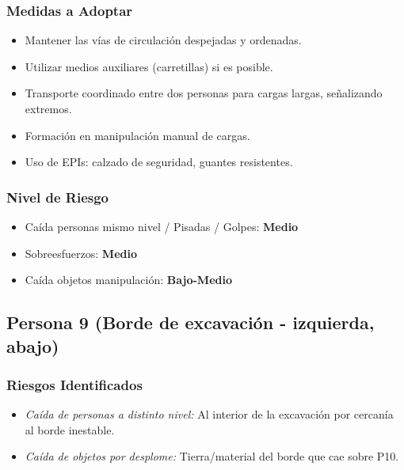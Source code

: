 \documentclass[12pt,a4paper]{article}
\begin{document}
	\subsubsection{Medidas a Adoptar}
	\begin{itemize}
		\item Mantener las vías de circulación despejadas y ordenadas.
		\item Utilizar medios auxiliares (carretillas) si es posible.
		\item Transporte coordinado entre dos personas para cargas largas, señalizando extremos.
		\item Formación en manipulación manual de cargas.
		\item Uso de EPIs: calzado de seguridad, guantes resistentes.
	\end{itemize}
	
	\subsubsection{Nivel de Riesgo}
	\begin{itemize}
		\item Caída personas mismo nivel / Pisadas / Golpes: \textbf{Medio}
		\item Sobreesfuerzos: \textbf{Medio}
		\item Caída objetos manipulación: \textbf{Bajo-Medio}
	\end{itemize}
	
	\bigskip\hrulefill\bigskip
	
	\subsection{Persona 9 (Borde de excavación - izquierda, abajo)}
	
	\subsubsection{Riesgos Identificados}
	\begin{itemize}
		\item \textit{Caída de personas a distinto nivel:} Al interior de la excavación por cercanía al borde inestable.
		\item \textit{Caída de objetos por desplome:} Tierra/material del borde que cae sobre P10.
	\end{itemize}
	
\end{document}
